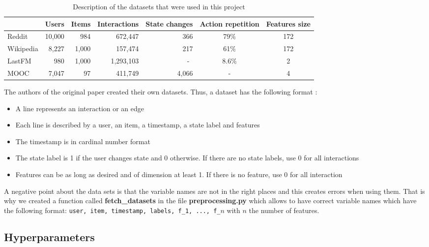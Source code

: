 \setlength\tabcolsep{0.12cm} %
\begin{table}[htbp]
    \centering
    \begin{tabular}{@{}lrrrrcc@{}}
    \toprule
    & Users & Items & Interactions & State changes & Action repetition & Features size \\
    \midrule
    Reddit & 10,000 & 984 & 672,447 & 366 & 79\% & 172 \\
    Wikipedia & 8,227 & 1,000 & 157,474 & 217 & 61\% & 172 \\
    LastFM & 980 & 1,000 & 1,293,103 & -\textcolor{white}{0} & 8.6\% & 2 \\
    MOOC & 7,047 & 97 & 411,749 & 4,066 & - & 4 \\
    \bottomrule
    \end{tabular}
    \caption{Description of the datasets that were used in this project}
    \label{description data}
\end{table}
\setlength\tabcolsep{6pt} %

The authors of the original paper created their own datasets. Thus, a dataset has the following format :
\begin{itemize}
    \item A line represents an interaction or an edge
    \item Each line is described by a user, an item, a timestamp, a state label and features
    \item The timestamp is in cardinal number format
    \item The state label is 1 if the user changes state and 0 otherwise. If there are no state labels, use 0 for all interactions
    \item Features can be as long as desired and of dimension at least 1. If there is no feature, use 0 for all interaction
\end{itemize}
A negative point about the data sets is that the variable names are not in the right places and this creates errors when using them. That is why we created a function called \textbf{fetch\_datasets} in the file \textbf{preprocessing.py} which allows to have correct variable names which have the following format: \texttt{user, item, timestamp, labels, f\_1, ..., f\_$n$} with $n$ the number of features.\\

\subsection*{Hyperparameters}

